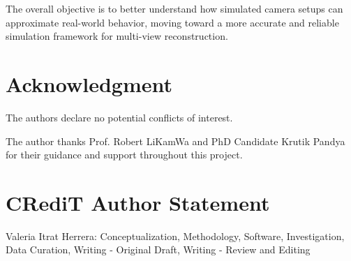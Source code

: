 \documentclass[conference]{IEEEtran}
\begin{document}
The overall objective is to better understand how simulated camera setups can approximate real-world behavior, moving toward a more accurate and reliable simulation framework for multi-view reconstruction.

\section*{Acknowledgment}
The authors declare no potential conflicts of interest.

The author thanks Prof. Robert LiKamWa and PhD Candidate Krutik Pandya for their guidance and support throughout this project.

\section*{CRediT Author Statement}
Valeria Itrat Herrera: Conceptualization, Methodology, Software, Investigation, Data Curation, Writing - Original Draft, Writing - Review and Editing



\end{document}
